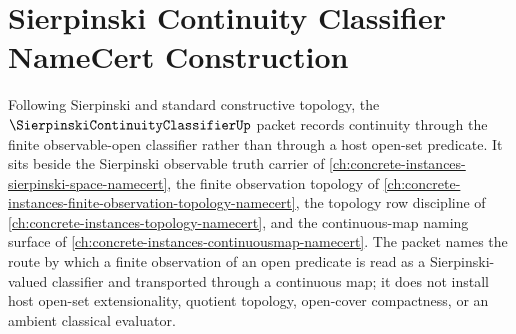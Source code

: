 \chapter{Sierpinski Continuity Classifier NameCert Construction}
\label{ch:concrete-instances-sierpinski-continuity-classifier-namecert}

Following Sierpinski and standard constructive topology, the $\SierpinskiContinuityClassifierUp$ packet records continuity through the finite observable-open classifier rather than through a host open-set predicate. It sits beside the Sierpinski observable truth carrier of \autoref{ch:concrete-instances-sierpinski-space-namecert}, the finite observation topology of \autoref{ch:concrete-instances-finite-observation-topology-namecert}, the topology row discipline of \autoref{ch:concrete-instances-topology-namecert}, and the continuous-map naming surface of \autoref{ch:concrete-instances-continuousmap-namecert}. The packet names the route by which a finite observation of an open predicate is read as a Sierpinski-valued classifier and transported through a continuous map; it does not install host open-set extensionality, quotient topology, open-cover compactness, or an ambient classical evaluator.


